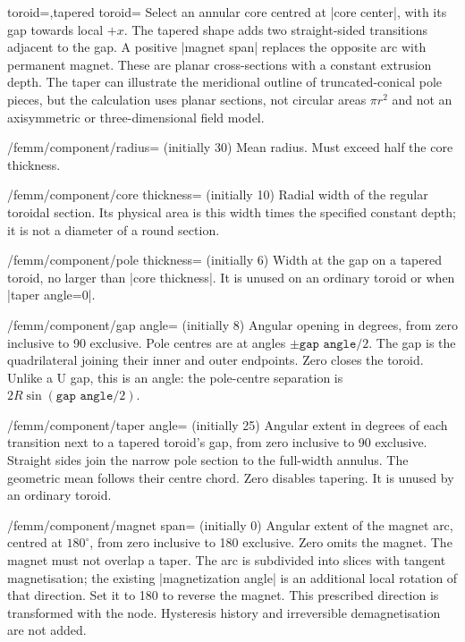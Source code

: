 
\begin{keylist}{toroid=,tapered toroid=}
Select an annular core centred at |core center|, with its gap towards local
$+x$. The tapered shape adds two straight-sided transitions adjacent to the
gap. A positive |magnet span| replaces the opposite arc with permanent magnet.
These are planar cross-sections with a constant extrusion depth. The taper
can illustrate the meridional outline of truncated-conical pole pieces, but
the calculation uses planar sections, not circular areas $\pi r^2$ and not
an axisymmetric or three-dimensional field model.
\end{keylist}
\begin{key}{/femm/component/radius= (initially 30)}
Mean radius. Must exceed half the core thickness.
\end{key}
\begin{key}{/femm/component/core thickness= (initially 10)}
Radial width of the regular toroidal section. Its physical area is this width
times the specified constant depth; it is not a diameter of a round section.
\end{key}
\begin{key}{/femm/component/pole thickness= (initially 6)}
Width at the gap on a tapered toroid, no larger than |core thickness|.
It is unused on an ordinary toroid or when |taper angle=0|.
\end{key}
\begin{key}{/femm/component/gap angle= (initially 8)}
Angular opening in degrees, from zero inclusive to 90 exclusive. Pole centres
are at angles $\pm\texttt{gap angle}/2$. The gap is the quadrilateral joining
their inner and outer endpoints. Zero closes the toroid. Unlike a U gap,
this is an angle: the pole-centre separation is
$2R\sin(\texttt{gap angle}/2)$.
\end{key}
\begin{key}{/femm/component/taper angle= (initially 25)}
Angular extent in degrees of each transition next to a tapered toroid's gap,
from zero inclusive to 90 exclusive. Straight sides join the narrow pole
section to the full-width annulus. The geometric mean follows their centre
chord. Zero disables tapering. It is unused by an ordinary toroid.
\end{key}
\begin{key}{/femm/component/magnet span= (initially 0)}
Angular extent of the magnet arc, centred at $180^\circ$, from zero inclusive
to 180 exclusive. Zero omits the magnet. The magnet must not overlap a taper.
The arc is subdivided into slices with tangent magnetisation; the existing
|magnetization angle| is an additional local rotation of that direction.
Set it to 180 to reverse the magnet. This prescribed direction is transformed
with the node. Hysteresis history and irreversible demagnetisation are not added.
\end{key}
